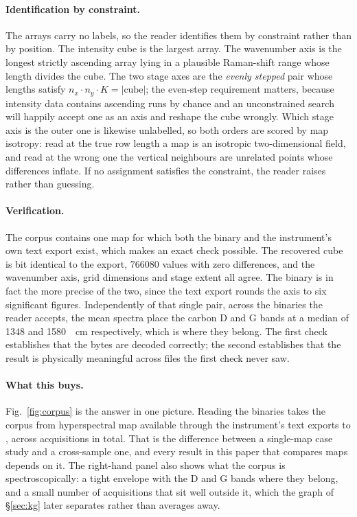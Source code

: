\paragraph{Identification by constraint.}
The arrays carry no labels, so the reader identifies them by constraint rather
than by position. The intensity cube is the largest array. The wavenumber axis
is the longest strictly ascending array lying in a plausible Raman-shift range
whose length divides the cube. The two stage axes are the \emph{evenly stepped}
pair whose lengths satisfy $n_x \cdot n_y \cdot K = |\text{cube}|$; the
even-step requirement matters, because intensity data contains ascending runs
by chance and an unconstrained search will happily accept one as an axis and
reshape the cube wrongly. Which stage axis is the outer one is likewise
unlabelled, so both orders are scored by map isotropy: read at the true row
length a map is an isotropic two-dimensional field, and read at the wrong one
the vertical neighbours are unrelated points whose differences inflate. If no
assignment satisfies the constraint, the reader raises rather than guessing.

\paragraph{Verification.}
The corpus contains one map for which both the binary and the instrument's own
text export exist, which makes an exact check possible. The recovered cube is
bit identical to the export, \SI{766080}{}  values with zero
differences, and the wavenumber axis, grid dimensions and stage extent all
agree. The binary is in fact the more precise of the two, since the text export
rounds the axis to six significant figures. Independently of that single pair,
across the \Nlsix{} binaries the reader accepts, the mean spectra place the
carbon D and G bands at a median of \SI{1348}{} and
\SI{1580}{\per\centi\metre} respectively, which is where they belong. The first
check establishes that the bytes are decoded correctly; the second establishes
that the result is physically meaningful across files the first check never
saw.

\paragraph{What this buys.}
Fig.~\ref{fig:corpus} is the answer in one picture. Reading the binaries takes
the corpus from \Nrawmaptext{} hyperspectral map available through the
instrument's text exports to \Nrawmap, across \Nacq{} acquisitions in total.
That is the difference between a single-map case study and a cross-sample one,
and every result in this paper that compares maps depends on it. The right-hand
panel also shows what the corpus is spectroscopically: a tight envelope with the
D and G bands where they belong, and a small number of acquisitions that sit
well outside it, which the graph of \S\ref{sec:kg} later separates rather than
averages away.

